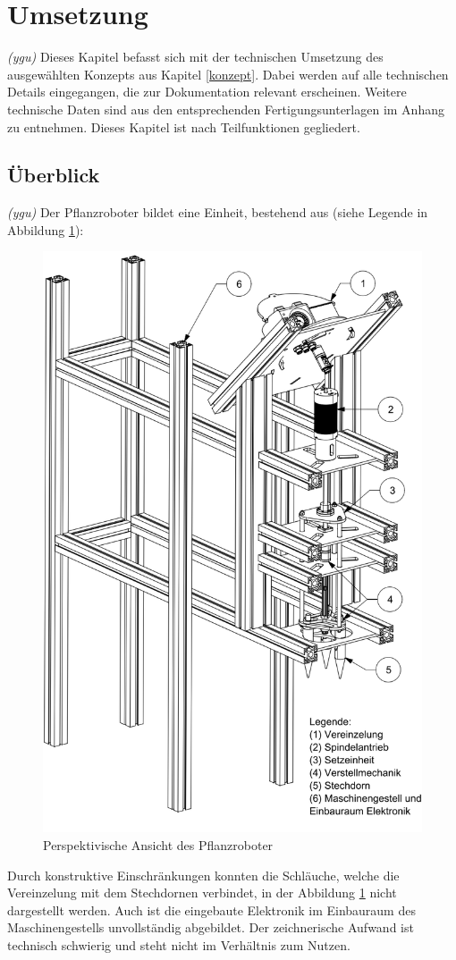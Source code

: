 \newpage
\section{Umsetzung} 
\label{kap:Umsetzung}
\textit{(ygu)} Dieses Kapitel befasst sich mit der technischen Umsetzung des ausgewählten Konzepts aus Kapitel \ref{konzept}. Dabei werden auf alle technischen Details eingegangen, die zur Dokumentation relevant erscheinen. Weitere technische Daten sind aus den entsprechenden Fertigungsunterlagen im Anhang zu entnehmen. Dieses Kapitel ist nach Teilfunktionen gegliedert. 
\subsection{Überblick}
\textit{(ygu)} Der Pflanzroboter bildet eine Einheit, bestehend aus (siehe Legende in Abbildung \ref{fig:uberblick}):
	\begin{figure}[H]
	\includegraphics[scale=0.445]{Illustrationen/6-Umsetzung/uberblick.png}
	\caption{Perspektivische Ansicht des Pflanzroboter}
	\label{fig:uberblick}
	\end{figure}
Durch konstruktive Einschränkungen konnten die Schläuche, welche die Vereinzelung mit dem Stechdornen verbindet, in der Abbildung \ref{fig:uberblick} nicht dargestellt werden. Auch ist die eingebaute Elektronik im Einbauraum des Maschinengestells unvollständig abgebildet. Der zeichnerische Aufwand ist technisch schwierig und steht nicht im Verhältnis zum Nutzen. 
